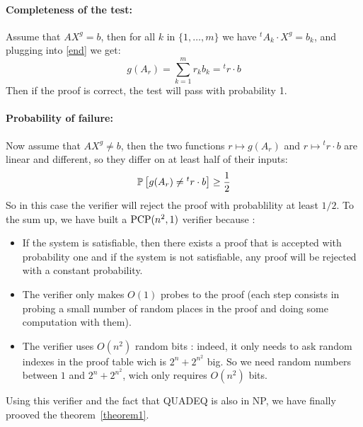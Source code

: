 \paragraph{Completeness of the test:} Assume that $AX^g = b$, then for all $k$
in $\{1,\ldots,m\}$ we have ${}^tA_k\cdot X^g = b_k$, and plugging into
\eqref{end}
we get:
\begin{displaymath}
g(A_r) = \sum_{k=1}^m r_kb_k = {}^tr\cdot b
\end{displaymath}
Then if the proof is correct, the test will pass with probability 1.

\paragraph{Probability of failure:} Now assume that $AX^g \neq b$, then the two
functions $r\mapsto g(A_r)$ and $r\mapsto {}^tr\cdot b$ are linear and
different, so they differ on at least half of their inputs:
\begin{displaymath}
\mathbb{P}\left[g(A_r)\neq {}^tr\cdot b\right] \geq \frac{1}{2}
\end{displaymath}
So in this case the verifier will reject the proof with probablility at least
$1/2$.
\newpage
To the sum up, we have built a $\mathrm{PCP}(n^2,1)$  verifier because :
\begin{itemize}
\item If the system is satisfiable, then there exists a proof that is accepted
with probability one and if the system is not satisfiable, any proof will be
rejected with a constant probability.
\item The verifier only makes $O(1)$ probes to the proof (each step consists in
probing a small number of random places in the proof and doing some computation
with them).
\item The verifier uses $O(n^2)$ random bits : indeed, it only needs to ask
random indexes in the proof table wich is $2^n+2^{n^2}$ big. So we need random
numbers between $1$ and $2^n+2^{n^2}$, wich only requires $O(n^2)$ bits.
\end{itemize}

Using this verifier and the fact that \textsf{QUADEQ} is also in NP, we have
finally prooved the theorem~\ref{theorem1}.



